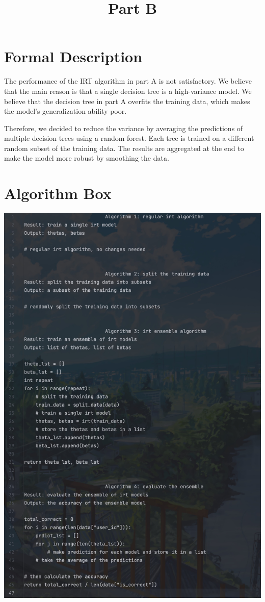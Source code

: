 \documentclass{article}
\title{Part B}
\date{\vspace{-10.0ex}}
\begin{document}
\maketitle
\thispagestyle{fancy}

\section*{Formal Description}

The performance of the IRT algorithm in part A is not satisfactory. We believe that the main reason is that a single decision tree is a high-variance model. We believe that the decision tree in part A overfits the training data, which makes the model's generalization ability poor.

Therefore, we decided to reduce the variance by averaging the predictions of multiple decision trees using a random forest. Each tree is trained on a different random subset of the training data. The results are aggregated at the end to make the model more robust by smoothing the data.

\section*{Algorithm Box}

\includegraphics[width=0.7\linewidth]{6051723192250_.pic.jpg}
\end{document}
